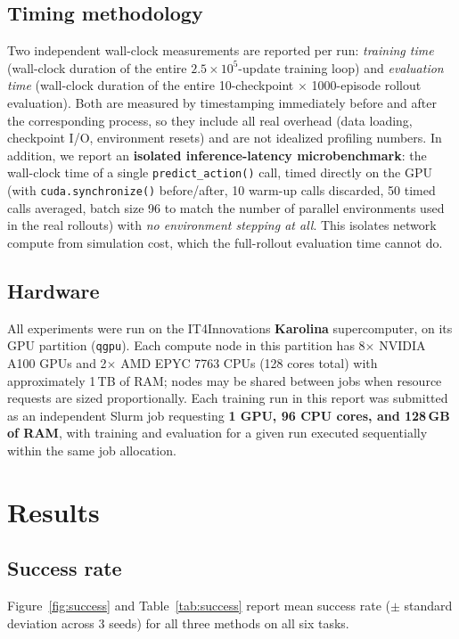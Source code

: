 \documentclass[11pt]{article}
\begin{document}
\subsection{Timing methodology}

Two independent wall-clock measurements are reported per run: \emph{training
time} (wall-clock duration of the entire $2.5\times10^{5}$-update training
loop) and \emph{evaluation time} (wall-clock duration of the entire
10-checkpoint $\times$ 1000-episode rollout evaluation). Both are measured by
timestamping immediately before and after the corresponding process, so they
include all real overhead (data loading, checkpoint I/O, environment
resets) and are not idealized profiling numbers. In addition, we report an
\textbf{isolated inference-latency microbenchmark}: the wall-clock time of a
single \texttt{predict\_action()} call, timed directly on the GPU (with
\texttt{cuda.synchronize()} before/after, 10 warm-up calls discarded, 50
timed calls averaged, batch size 96 to match the number of parallel
environments used in the real rollouts) with \emph{no environment stepping
at all}. This isolates network compute from simulation cost, which the
full-rollout evaluation time cannot do.

\subsection{Hardware}

All experiments were run on the IT4Innovations \textbf{Karolina}
supercomputer, on its GPU partition (\texttt{qgpu}). Each compute node in
this partition has 8$\times$ NVIDIA A100 GPUs and 2$\times$ AMD EPYC 7763
CPUs (128 cores total) with approximately 1\,TB of RAM; nodes may be shared
between jobs when resource requests are sized proportionally. Each training
run in this report was submitted as an independent Slurm job requesting
\textbf{1 GPU, 96 CPU cores, and 128\,GB of RAM}, with training and
evaluation for a given run executed sequentially within the same job
allocation.

\section{Results}

\subsection{Success rate}

Figure~\ref{fig:success} and Table~\ref{tab:success} report mean success
rate ($\pm$ standard deviation across 3 seeds) for all three methods on all
six tasks.
\end{document}
